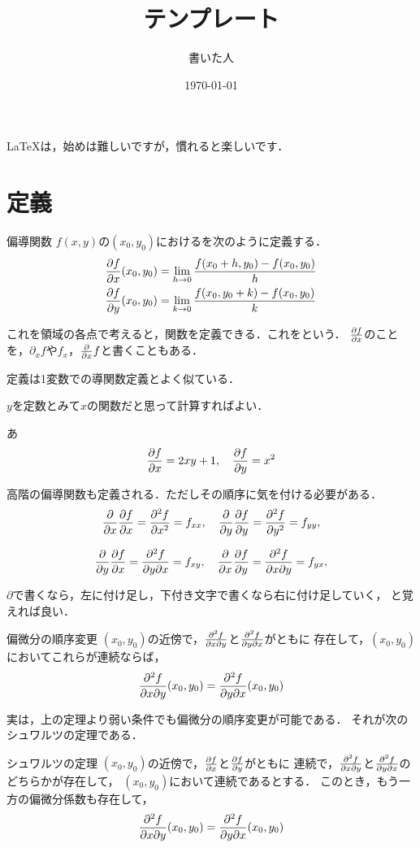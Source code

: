 \documentclass[dvipdfmx,a4j,11pt]{jsarticle}
\title{テンプレート}
\author{書いた人}
\date{\today}
\begin{document}
\maketitle


\LaTeX は，始めは難しいですが，慣れると楽しいです．

\section{定義}


\begin{dfn}{偏導関数}{}
   $f(x,y)$の$(x_0,y_0)$におけるを次のように定義する．
   \begin{align}
      \pdv{f}{x}\qty(x_0,y_0)&=\lim_{h\to 0}\frac{f(x_0+h,y_0)-f(x_0,y_0)}{h}\\
      \pdv{f}{y}\qty(x_0,y_0)&=\lim_{k\to 0}\frac{f(x_0,y_0+k)-f(x_0,y_0)}{k} 
   \end{align}
   
   これを領域の各点で考えると，関数を定義できる．これをという．
   $\pdv{f}{x}$のことを，$\partial_x f$や$f_x$，$\pdv{x}f$と書くこともある．
\end{dfn}

定義は1変数での導関数定義とよく似ている．

$y$を定数とみて$x$の関数だと思って計算すればよい．

\begin{ex}{}{}
あ
\[ \pdv{f}{x}=2xy+1, \ \  \ \pdv{f}{y}=x^2\]
\end{ex}



高階の偏導関数も定義される．ただしその順序に気を付ける必要がある．
\[ \pdv{x} \pdv{f}{x} =\pdv[2]{f}{x}=f_{xx},\ \ \
   \pdv{y} \pdv{f}{y} =\pdv[2]{f}{y}=f_{yy},\]

\[ \pdv{y} \pdv{f}{x} =\pdv{f}{y}{x}=f_{xy},\ \ \
   \pdv{x} \pdv{f}{y} =\pdv{f}{x}{y}=f_{yx},\]

$\partial$で書くなら，左に付け足し，下付き文字で書くなら右に付け足していく，
と覚えれば良い．


\begin{prop}{偏微分の順序変更}{}
   $(x_0,y_0)$の近傍で，$\pdv{f}{x}{y}$と$\pdv{f}{y}{x}$がともに
   存在して，$(x_0,y_0)$においてこれらが連続ならば，
   \[ \pdv{f}{x}{y} \qty(x_0,y_0)=\pdv{f}{y}{x} \qty(x_0,y_0) \]
\end{prop}

実は，上の定理より弱い条件でも偏微分の順序変更が可能である．
それが次のシュワルツの定理である．
\begin{thm}{シュワルツの定理}{}
   $(x_0,y_0)$の近傍で，$\pdv{f}{x}$と$\pdv{f}{y}$がともに
   連続で，$\pdv{f}{x}{y}$と$\pdv{f}{y}{x}$のどちらかが存在して，
   $(x_0,y_0)$において連続であるとする．
   このとき，もう一方の偏微分係数も存在して，
   \[ \pdv{f}{x}{y} \qty(x_0,y_0)=\pdv{f}{y}{x} \qty(x_0,y_0) \]
\end{thm}
\end{document}
